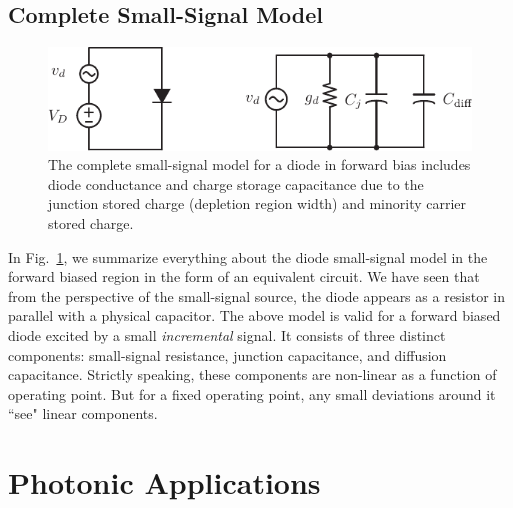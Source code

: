 \subsection{Complete Small-Signal Model}
\begin{figure}[tb]
\centering
\includegraphics[width=.75\columnwidth]{diode_ss_model}
\caption{The complete small-signal model for a diode in forward bias includes diode conductance and charge storage capacitance due to the junction stored charge (depletion region width) and minority carrier stored charge.}
\label{fig:diode_ss_model}
\end{figure}
In Fig.~\ref{fig:diode_ss_model}, we summarize everything about the diode small-signal model in the forward biased region in the form of an equivalent circuit.  We have seen that  from the perspective of the small-signal source, the diode appears as a resistor in parallel with a physical capacitor.    The above model is valid for a forward biased diode excited by a small \emph{incremental} signal.   It consists of three distinct components:  small-signal resistance, junction capacitance, and diffusion capacitance.  Strictly speaking, these components are non-linear as a function of operating point.  But for a fixed operating point, any small deviations around it ``see" linear components.
\section{Photonic Applications}
